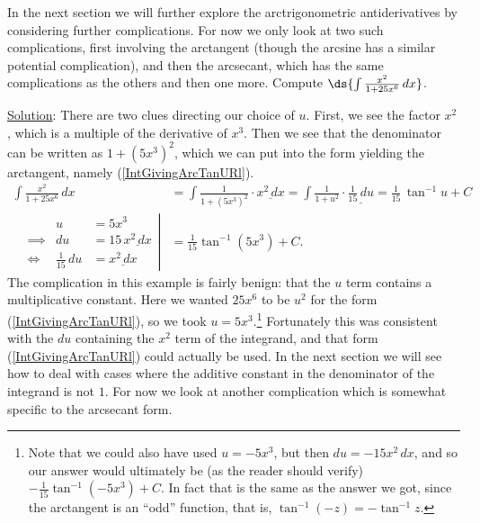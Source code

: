 \eex



















In the next section we will further explore the arctrigonometric
antiderivatives by considering further complications.
For now we only look at two such complications, first involving the
arctangent (though the arcsine has a similar potential complication),
and then the arcsecant, which has the same complications as the others
and then one more.
\bex Compute $\ds{\int\frac{x^2}{1+25x^6}\,dx}$.

\underline{Solution}: There are two clues directing our choice of $u$.
First, we see the factor $x^2$, which is a multiple of the derivative
of $x^3$.  Then we see that the denominator can be written
as $1+\left(5x^3\right)^2$, which we can put into the form
yielding the arctangent, namely (\ref{IntGivingArcTanURl}).
\begin{align*}
\int\frac{x^2}{1+25x^6}\,dx
&=\int\frac{1}{1+\left(5x^3\right)^2}\cdot\underline{x^2\,dx}
=\int\frac1{1+u^2}\cdot\underline{\frac1{15}\,du}
=\frac1{15}\,\tan^{-1}u+C\\
\left.\begin{alignedat}{2}
  &&u&=5x^3\\
&\implies&du&=15\,\underline{x^2\,dx}\\
&\iff&\frac1{15}\,du&=\underline{x^2\,dx}
\end{alignedat}\right|&=\frac1{15}\tan^{-1}\left(5x^3\right)+C.
\end{align*}
\eex
The complication in this example is fairly benign: that the $u$ term
contains a multiplicative constant.  Here we wanted $25x^6$ to be
$u^2$ for the form (\ref{IntGivingArcTanURl}), so we took 
$u=5x^3$.\footnote{%
Note that we could also have used $u=-5x^3$, but then $du=-15x^2\,dx$,
and so our
answer would ultimately be 
(as the reader should verify) 
$-\frac{1}{15}\tan^{-1}\left(-5x^3\right)+C$.
In fact that is the same as the answer we got, since the arctangent
is an ``odd'' function, that is, $\tan^{-1}(-z)=-\tan^{-1}z$.
}
Fortunately this was consistent with the $du$ containing the $x^2$ term
of the integrand, and that form (\ref{IntGivingArcTanURl})
could actually be used.  In the next section we will
see how to deal with cases where the additive constant in the denominator
of the integrand is not $1$.  For now we look at another complication
which is somewhat specific to the arcsecant form.

